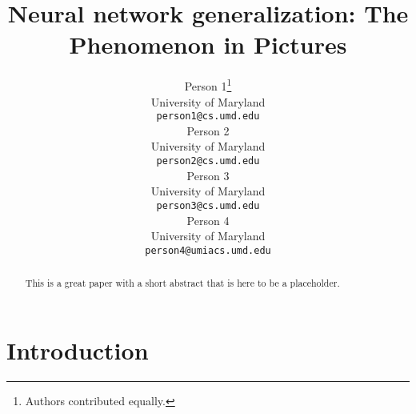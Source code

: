 \documentclass{article}
\title{Neural network generalization: The Phenomenon in Pictures}
\author{
Person 1\thanks{Authors contributed equally.}\\
University of Maryland\\
\texttt{person1@cs.umd.edu}\\
\And
Person 2\samethanks[1]\\
University of Maryland\\
\texttt{person2@cs.umd.edu}\\
\AND
Person 3\\
University of Maryland\\
\texttt{person3@cs.umd.edu}\\
\And
Person 4\\
University of Maryland\\
\texttt{person4@umiacs.umd.edu}\\
}
\begin{document}

    \maketitle

    \begin{abstract}

%
%
%
%
This is a great paper with a short abstract that is here to be a placeholder.

    \end{abstract}

    \section{Introduction}
\end{document}
